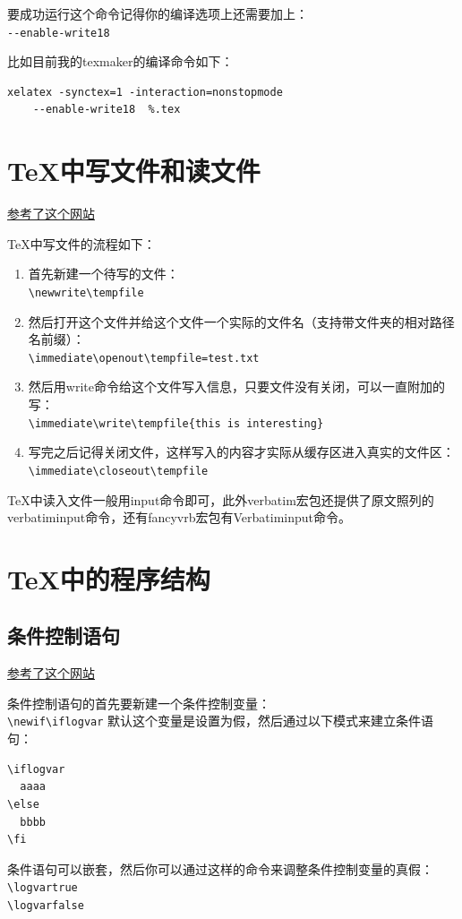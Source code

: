 \documentclass[12pt,oneside]{book}
\begin{document}
\begin{common-format}
要成功运行这个命令记得你的编译选项上还需要加上：\\
\verb+--enable-write18+

比如目前我的texmaker的编译命令如下：
\begin{Verbatim}
xelatex -synctex=1 -interaction=nonstopmode 
    --enable-write18  %.tex
\end{Verbatim}


\section{TeX中写文件和读文件}
\href{http://stackoverflow.com/questions/2115379/write-and-read-from-a-latex-temporary-file}{参考了这个网站}

TeX中写文件的流程如下： 
\begin{enumerate}
\item 首先新建一个待写的文件：\\
\verb+\newwrite\tempfile+
\item 然后打开这个文件并给这个文件一个实际的文件名（支持带文件夹的相对路径名前缀）：\\
\verb+\immediate\openout\tempfile=test.txt+
\item 然后用write命令给这个文件写入信息，只要文件没有关闭，可以一直附加的写：\\
\verb+\immediate\write\tempfile{this is interesting}+
\item 写完之后记得关闭文件，这样写入的内容才实际从缓存区进入真实的文件区：\\
\verb+\immediate\closeout\tempfile+
\end{enumerate}

TeX中读入文件一般用input命令即可，此外verbatim宏包还提供了原文照列的verbatiminput命令，还有fancyvrb宏包有Verbatiminput命令。

\section{TeX中的程序结构}
\subsection{条件控制语句}
\label{sec:条件控制语句}
\href{http://handyfloss.wordpress.com/2007/08/29/latex-programming-how-to-implement-conditionals/}{参考了这个网站}

条件控制语句的首先要新建一个条件控制变量：\\
\verb+\newif\iflogvar+
默认这个变量是设置为假，然后通过以下模式来建立条件语句：
\begin{Verbatim}
\iflogvar
  aaaa
\else
  bbbb
\fi
\end{Verbatim}
条件语句可以嵌套，然后你可以通过这样的命令来调整条件控制变量的真假：\\
\verb+\logvartrue+\\
\verb+\logvarfalse+


\end{common-format}
\end{document}

